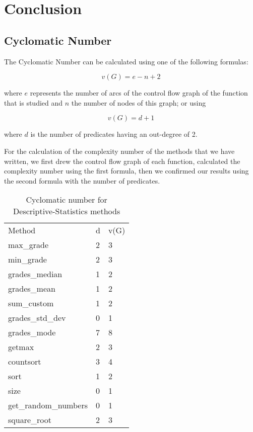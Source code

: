 \documentclass[11pt]{article}
\begin{document}
\newpage

\section{Conclusion}

\subsection{Cyclomatic Number}

The Cyclomatic Number can be calculated using one of the following formulas:

$$ v(G) = e - n + 2 $$

where $ e $ represents the number of arcs of the control flow graph of the function that is studied and $ n $ the number of nodes of this graph; or using

$$ v(G) = d + 1 $$

where $ d $ is the number of predicates having an out-degree of 2.\newline 

For the calculation of the complexity number of the methods that we have written, we first drew the control flow graph of each function, calculated the complexity number using the first formula, then we confirmed our results using the second formula with the number of predicates.\newline

\begin{table}[ht!]
\centering
\begin{tabular}{lll}
Method           & d & v(G) \\
max\_grade       & 2 & 3    \\
min\_grade       & 2 & 3    \\
grades\_median   & 1 & 2    \\
grades\_mean     & 1 & 2    \\
sum\_custom      & 1 & 2    \\
grades\_std\_dev & 0 & 1    \\
grades\_mode     & 7 & 8    \\
getmax           & 2 & 3    \\
countsort        & 3 & 4    \\
sort             & 1 & 2    \\
size             & 0 & 1    \\
get\_random\_numbers             & 0 & 1    \\
square\_root     & 2 & 3   
\end{tabular}
\caption{Cyclomatic number for Descriptive-Statistics methods}
\end{table}
\end{document}
